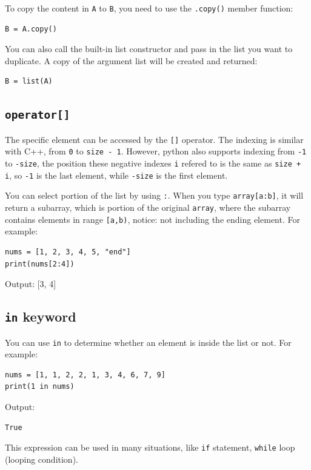 \documentclass[12pt]{book}
\begin{document}
To copy the content in \texttt{A} to \texttt{B}, you need to use the \texttt{.copy()} member function:
\begin{verbatim}
B = A.copy()
\end{verbatim}

You can also call the built-in list constructor and pass in the list you want to duplicate. A copy of the argument list will be created and returned:
\begin{verbatim}
B = list(A)
\end{verbatim}

\subsection{\texttt{operator[]}}
\label{sec:orgeed7aa4}
The specific element can be accessed by the \texttt{[]} operator. The indexing is similar with C++, from \texttt{0} to \texttt{size - 1}. However, python also supports indexing from \texttt{-1} to \texttt{-size}, the position these negative indexes \texttt{i} refered to is the same as \texttt{size + i}, so \texttt{-1} is the last element, while \texttt{-size} is the first element. 


You can select portion of the list by using \texttt{:}. When you type \texttt{array[a:b]}, it will return a subarray, which is portion of the original \texttt{array}, where the subarray contains elements in range \texttt{[a,b)}, notice: not including the ending element. For example:
\begin{verbatim}
nums = [1, 2, 3, 4, 5, "end"]
print(nums[2:4])
\end{verbatim}
Output:
[3, 4]
\subsection{\texttt{in} keyword}
\label{sec:orgedb6fa1}
You can use \texttt{in} to determine whether an element is inside the list or not. For example:
\begin{verbatim}
nums = [1, 1, 2, 2, 1, 3, 4, 6, 7, 9]
print(1 in nums)
\end{verbatim}
Output:
\begin{verbatim}
True
\end{verbatim}

This expression can be used in many situations, like \texttt{if} statement, \texttt{while} loop (looping condition).
\end{document}

